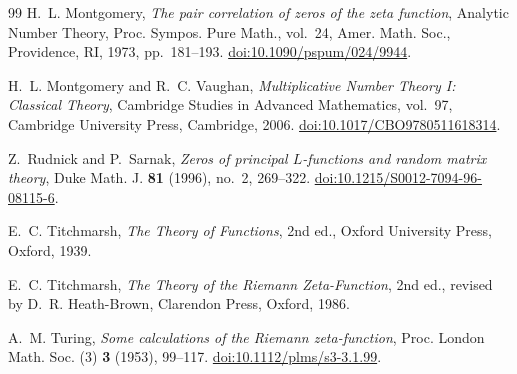\documentclass[11pt,reqno]{amsart}
\numberwithin{equation}{section}
\theoremstyle{plain}
\theoremstyle{definition}
\theoremstyle{remark}
\begin{document}
\begin{thebibliography}{99}
H.~L. Montgomery, \emph{The pair correlation of zeros of the zeta function}, Analytic Number Theory, Proc. Sympos. Pure Math., vol.~24, Amer. Math. Soc., Providence, RI, 1973, pp.~181--193. \href{https://doi.org/10.1090/pspum/024/9944}{doi:10.1090/pspum/024/9944}.

H.~L. Montgomery and R.~C. Vaughan, \emph{Multiplicative Number Theory I: Classical Theory}, Cambridge Studies in Advanced Mathematics, vol.~97, Cambridge University Press, Cambridge, 2006. \href{https://doi.org/10.1017/CBO9780511618314}{doi:10.1017/CBO9780511618314}.

Z.~Rudnick and P.~Sarnak, \emph{Zeros of principal $L$-functions and random matrix theory}, Duke Math. J. \textbf{81} (1996), no.~2, 269--322. \href{https://doi.org/10.1215/S0012-7094-96-08115-6}{doi:10.1215/S0012-7094-96-08115-6}.

E.~C. Titchmarsh, \emph{The Theory of Functions}, 2nd ed., Oxford University Press, Oxford, 1939.

E.~C. Titchmarsh, \emph{The Theory of the Riemann Zeta-Function}, 2nd ed., revised by D.~R. Heath-Brown, Clarendon Press, Oxford, 1986.

A.~M. Turing, \emph{Some calculations of the Riemann zeta-function}, Proc. London Math. Soc. (3) \textbf{3} (1953), 99--117. \href{https://doi.org/10.1112/plms/s3-3.1.99}{doi:10.1112/plms/s3-3.1.99}.

\end{thebibliography}
\end{document}
